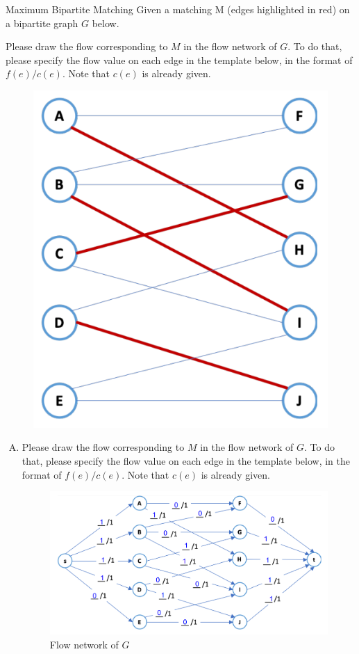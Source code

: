 \documentclass{article}
\numberwithin{table}{section}
\numberwithin{figure}{section}
\begin{document}
\newpage
\begin{section}{Maximum Bipartite Matching}
    Given a matching M (edges highlighted in red) on a bipartite graph $G$ below.

Please draw the flow corresponding to $M$ in the flow network of $G$. To do that, please specify the flow value on each edge in the template below, in the format of $f(e)/c(e)$. Note that $c(e)$ is already given.
\begin{figure}[H]
    \centering
    \includegraphics[width=0.4\linewidth]{figures/p4/1.png}
\end{figure}
\begin{enumerate}[(A)]
    \item Please draw the flow corresponding to $M$ in the flow network of $G$. To do that, please specify the flow value on each edge in the template below, in the format of $f(e)/c(e)$. Note that $c(e)$ is already given.
    
    \begin{tcolorbox}
        \begin{figure}[H]
            \centering
            \includegraphics[width=\linewidth]{figures/p4/2.png}
            \caption{Flow network of $G$}
        \end{figure}
    \end{tcolorbox}


\end{enumerate}
\end{section}
\end{document}
